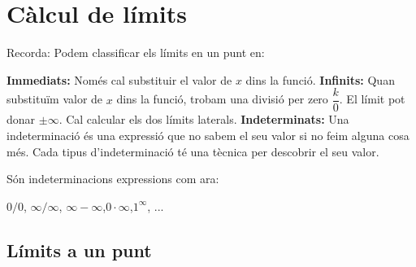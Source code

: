 \begin{mylist}
\answers{[$\limx{1^-} f=1$; $\limx{1^+} f=1$,
	$\limx{1^-} f=1/6$; $\limx{1^+} f=5/4$,
	$\limx{0^-} f=-\infty$; $\limx{0^+} f=0$,
	$\limx{5^-} f=10$; $\limx{5^+} f=10$]}  

\end{mylist}




\section{Càlcul de límits}

\begin{theorybox}
	Recorda: Podem classificar els límits en un punt en:
	\begin{itemize}
		\exer \textbf{Immediats:} Només cal substituir el valor de $x$ dins la funció.
		\exer \textbf{Infinits:} Quan substituïm valor de $x$ dins la funció, trobam una divisió per zero $\dfrac{k}{0}$. El límit pot donar $\pm \infty$. Cal calcular els dos límits laterals.
			\exer \textbf{Indeterminats:} Una indeterminació és una expressió que no sabem el seu valor si no feim alguna cosa més. Cada tipus d'indeterminació té una tècnica per descobrir el seu valor.
			
			Són indeterminacions expressions com ara:
		     \begin{center}
			$0/0$, \quad $\infty/\infty$, \quad $\infty - \infty$,\quad  $0\cdot \infty$,\quad  $1^\infty$, ...
			\end{center}
		
	\end{itemize}
\end{theorybox}

\vspace{2cm} 
\subsection{Límits a un punt}

\begin{theorybox}
\end{theorybox}
 
